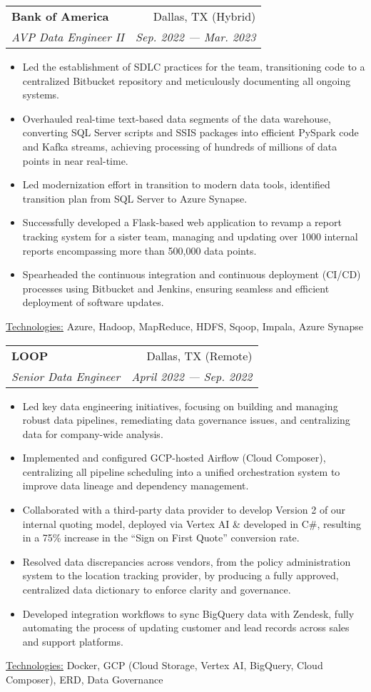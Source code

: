 \documentclass[11pt, a4paper]{article}
\makeatletter
\newcommand{\resumeItem}[1]{%
  \item\small{
    #1
  }
}
\newcommand{\resumeSubheading}[4]{
  \vspace{8pt}\item%
    \begin{tabular*}{0.97\textwidth}[t]{l@{\extracolsep{\fill}}r}
      \textbf{#1} & #2 \\
      \textit{\small#3} & \textit{\small #4} \\
    \end{tabular*}\vspace{-5pt}
}
\newcommand{\resumeItemListStart}{\begin{itemize}}
\newcommand{\resumeItemListEnd}{\end{itemize}\vspace{-5pt}}
\newcommand{\resumeTech}[2]{
 \underline{#1:} #2
}
\makeatother
\begin{document}
\resumeSubheading
      {Bank of America}{Dallas, TX (Hybrid)}
      {AVP Data Engineer II}{Sep. 2022 — Mar. 2023}
      \resumeItemListStart
      \resumeItem{Led the establishment of SDLC practices for the team, transitioning code to a centralized Bitbucket repository and meticulously documenting all ongoing systems.}
      \resumeItem{Overhauled real-time text-based data segments of the data warehouse, converting SQL Server scripts and SSIS packages into efficient PySpark code and Kafka streams, achieving processing of hundreds of millions of data points in near real-time.}
      \resumeItem{Led modernization effort in transition to modern data tools, identified transition plan from SQL Server to Azure Synapse.}
      \resumeItem{Successfully developed a Flask-based web application to revamp a report tracking system for a sister team, managing and updating over 1000 internal reports encompassing more than 500,000 data points.}
      \resumeItem{Spearheaded the continuous integration and continuous deployment (CI/CD) processes using Bitbucket and Jenkins, ensuring seamless and efficient deployment of software updates.}
\resumeItemListEnd
\resumeTech{Technologies}{Azure, Hadoop, MapReduce, HDFS, Sqoop, Impala, Azure Synapse}



\resumeSubheading
      {LOOP}{Dallas, TX (Remote)}
      {Senior Data Engineer}{April 2022 — Sep. 2022}
      \resumeItemListStart
        \resumeItem{Led key data engineering initiatives, focusing on building and managing robust data pipelines, remediating data governance issues, and centralizing data for company-wide analysis.}
        \resumeItem{Implemented and configured GCP-hosted Airflow (Cloud Composer), centralizing all pipeline scheduling into a unified orchestration system to improve data lineage and dependency management.}
        \resumeItem{Collaborated with a third-party data provider to develop Version 2 of our internal quoting model, deployed via Vertex AI \& developed in C\#, resulting in a 75\% increase in the “Sign on First Quote” conversion rate.}
        \resumeItem{Resolved data discrepancies across vendors, from the policy administration system to the location tracking provider, by producing a fully approved, centralized data dictionary to enforce clarity and governance.}
        \resumeItem{Developed integration workflows to sync BigQuery data with Zendesk, fully automating the process of updating customer and lead records across sales and support platforms.}
      \resumeItemListEnd
      \resumeTech{Technologies}{Docker, GCP (Cloud Storage, Vertex AI, BigQuery, Cloud Composer), ERD, Data Governance}\\
\end{document}
